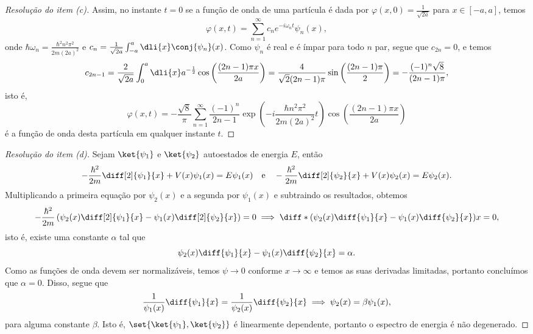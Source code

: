 \begin{proof}[Resolução do item (c)]
    Assim, no instante \(t = 0\) se a função de onda de uma partícula é dada por \(\varphi(x, 0) = \frac{1}{\sqrt{2a}}\) para \(x \in [-a,a]\), temos
    \begin{equation*}
        \varphi(x, t) = \sum_{n = 1}^\infty c_n e^{-i \omega_n t}\psi_n(x),
    \end{equation*}
    onde \(\hbar \omega_n = \frac{\hbar^2 n^2 \pi^2}{2m(2a)^2}\) e \(c_n = \frac{1}{\sqrt{2a}}\int_{-a}^a \dli{x} \conj{\psi_n}(x)\). Como \(\psi_n\) é real e é ímpar para todo \(n\) par, segue que \(c_{2n} = 0\), e temos
    \begin{equation*}
        c_{2n - 1} = \frac{2}{\sqrt{2a}} \int_{0}^a \dli{x} a^{-\frac12} \cos\left(\frac{(2n-1)\pi x}{2a}\right) = \frac{4}{\sqrt{2}(2n - 1)\pi} \sin\left(\frac{(2n - 1)\pi}{2}\right) = -\frac{(-1)^n\sqrt{8}}{(2n - 1) \pi},
    \end{equation*}
    isto é,
    \begin{equation*}
        \varphi(x, t) = -\frac{\sqrt{8}}{\pi} \sum_{n = 1}^\infty \frac{(-1)^n}{2n - 1}\exp\left(-i\frac{\hbar n^2 \pi^2}{2m(2a)^2}t\right)\cos\left(\frac{(2n-1)\pi x}{2a}\right)
    \end{equation*}
    é a função de onda desta partícula em qualquer instante \(t\).
\end{proof}

\begin{proof}[Resolução do item (d)]
    Sejam \(\ket{\psi_1}\) e \(\ket{\psi_2}\) autoestados de energia \(E\), então
    \begin{equation*}
        -\frac{\hbar^2}{2m}\diff[2]{\psi_1}{x} + V(x)\psi_1(x) = E\psi_1(x) \quad\text{e}\quad
        -\frac{\hbar^2}{2m}\diff[2]{\psi_2}{x} + V(x)\psi_2(x) = E\psi_2(x).
    \end{equation*}
    Multiplicando a primeira equação por \(\psi_2(x)\) e a segunda por \(\psi_1(x)\) e subtraindo os resultados, obtemos
    \begin{equation*}
        -\frac{\hbar^2}{2m} \left(\psi_2(x) \diff[2]{\psi_1}{x} - \psi_1(x) \diff[2]{\psi_2}{x}\right) = 0 \implies \diff*{\left(\psi_2(x)\diff{\psi_1}{x}-\psi_1(x) \diff{\psi_2}{x}\right)}{x} = 0,
    \end{equation*}
    isto é, existe uma constante \(\alpha\) tal que
    \begin{equation*}
        \psi_2(x) \diff{\psi_1}{x} - \psi_1(x) \diff{\psi_2}{x} = \alpha.
    \end{equation*}
    Como as funções de onda devem ser normalizáveis, temos \(\psi \to 0\) conforme \(x \to \infty\) e temos as suas derivadas limitadas, portanto concluímos que \(\alpha = 0\). Disso, segue que
    \begin{equation*}
        \frac{1}{\psi_1(x)}\diff{\psi_1}{x} = \frac{1}{\psi_2(x)}\diff{\psi_2}{x} \implies \psi_2(x) = \beta \psi_1(x),
    \end{equation*}
    para alguma constante \(\beta\). Isto é, \(\set{\ket{\psi_1},\ket{\psi_2}}\) é linearmente dependente, portanto o espectro de energia é não degenerado.
\end{proof}

